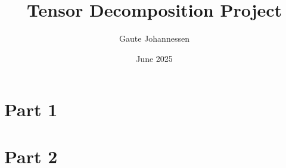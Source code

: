 \documentclass[10pt]{article}
\title{Tensor Decomposition Project}
\author{Gaute Johannessen}
\date{June 2025}
\begin{document}
\maketitle

\section*{Part 1}



\section*{Part 2}





\printbibliography
\end{document}
